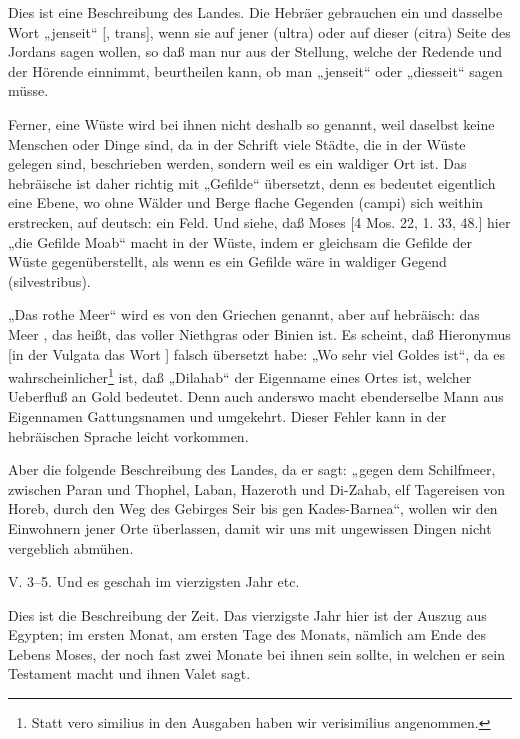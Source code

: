 Dies ist eine Beschreibung des Landes. Die Hebräer gebrauchen ein und dasselbe Wort „jenseit“ [, trans], wenn sie auf jener (ultra) oder auf dieser (citra) Seite des Jordans sagen wollen, so daß man nur aus der Stellung, welche der Redende und der Hörende einnimmt, beurtheilen kann, ob man „jenseit“ oder „diesseit“ sagen müsse.

Ferner, eine Wüste wird bei ihnen nicht deshalb so genannt, weil daselbst keine Menschen oder Dinge sind, da in der Schrift viele Städte, die in der Wüste gelegen sind, beschrieben werden, sondern weil es ein waldiger Ort ist. Das hebräische  ist daher richtig mit „Gefilde“ übersetzt, denn es bedeutet eigentlich eine Ebene, wo ohne Wälder und Berge flache Gegenden (campi) sich weithin erstrecken, auf deutsch: ein Feld. Und siehe, daß Moses [4 Mos. 22, 1. 33, 48.] hier „die Gefilde Moab“ macht in der Wüste, indem er gleichsam die Gefilde der Wüste gegenüberstellt, als wenn es ein Gefilde wäre in waldiger Gegend (silvestribus).

„Das rothe Meer“ wird es von den Griechen genannt, aber auf hebräisch: das Meer , das heißt, das voller Niethgras oder Binien ist. Es scheint, daß Hieronymus [in der Vulgata das Wort ] falsch übersetzt habe: „Wo sehr viel Goldes ist“, da es wahrscheinlicher\footnote{Statt vero similius in den Ausgaben haben wir verisimilius angenommen.} ist, daß „Dilahab“ der Eigenname eines Ortes ist, welcher Ueberfluß an Gold bedeutet. Denn auch anderswo macht ebenderselbe Mann aus Eigennamen Gattungsnamen und umgekehrt. Dieser Fehler kann in der hebräischen Sprache leicht vorkommen.

Aber die folgende Beschreibung des Landes, da er sagt: „gegen dem Schilfmeer, zwischen Paran und Thophel, Laban, Hazeroth und Di-Zahab, elf Tagereisen von Horeb, durch den Weg des Gebirges Seir bis gen Kades-Barnea“, wollen wir den Einwohnern jener Orte überlassen, damit wir uns mit ungewissen Dingen nicht vergeblich abmühen.

\begin{schriftzitat}
V. 3–5. Und es geschah im vierzigsten Jahr etc.
\end{schriftzitat}

Dies ist die Beschreibung der Zeit. Das vierzigste Jahr hier ist der Auszug aus Egypten; im ersten Monat, am ersten Tage des Monats, nämlich am Ende des Lebens Moses, der noch fast zwei Monate bei ihnen sein sollte, in welchen er sein Testament macht und ihnen Valet sagt.

